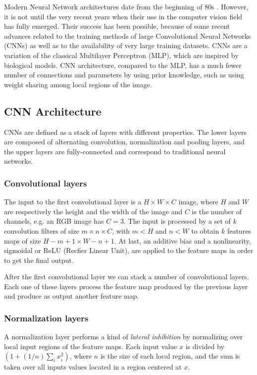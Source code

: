 \documentclass[review,12pt,3p]{elsarticle}
\begin{document}
Modern Neural Network architectures date from the beginning of 80s \cite{fukushima1980neocognitron}. However, it is not until the very recent years when their use in the computer vision field has fully emerged. Their success has been possible, because of some recent advances related to the training methods of large Convolutional Neural Networks (CNNs) \cite{krizhevsky2012imagenet} as well as to the availability of very large training datasets. CNNs are a variation of the classical Multilayer Perceptron (MLP), which are inspired by biological models. CNN architecture, compared to the MLP, has a much fewer number of connections and parameters by using prior knowledge, such as using weight sharing among local regions of the image.

\subsection{CNN Architecture}
CNNs are defined as a stack of layers with different properties. The lower layers are composed of alternating convolution, normalization and pooling layers, and the upper layers are fully-connected and correspond to traditional neural networks. 

\subsubsection{Convolutional layers}

The input to the first convolutional layer is a $H \times W \times C$ image, where $H$ and $W$ are respectively the height and the width of the image and $C$ is the number of channels, e.g. an RGB image has $C=3$. The input is processed by a set of $k$ convolution filters of size $m \times n \times C$, with $m < H$ and $n < W$ to obtain $k$ features maps of size $H-m+1 \times W-n+1$. At last, an additive bias and a nonlinearity, sigmoidal or ReLU (Recfier Linear Unit), are applied to the feature maps in order to get the final output.

After the first convolutional layer we can stack a number of convolutional layers. Each one of these layers process the feature map produced by the previous layer and produce as output another feature map. 

\subsubsection{Normalization layers}
A normalization layer performs a kind of {\em lateral inhibition} by normalizing over local input regions of the feature maps. Each input value $x$ is divided by $(1+(1/n) \sum_i x_i^2)$, where $n$ is the size of each local region, and the sum is taken over all inputs values located in a region centered at $x$.
\end{document}
